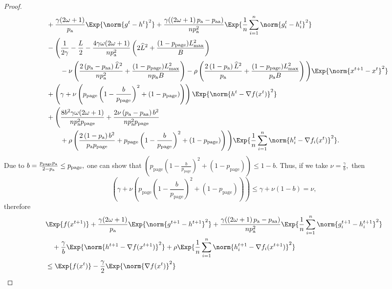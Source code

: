 \documentclass{article}
\newcommand*{\probavailable}{\ensuremath{p_{\textnormal{a}}}}
\newcommand*{\probpairaa}{\ensuremath{p_{\textnormal{aa}}}}
\newcommand*{\probpage}{\ensuremath{p_{\text{page}}}}
\begin{document}
\begin{proof}
\begin{align*}
      &\quad + \frac{\gamma (2 \omega + 1)}{\probavailable} \Exp{\norm{g^{t} - h^{t}}^2} + \frac{\gamma (\left(2 \omega + 1\right)\probavailable - \probpairaa)}{n \probavailable^2} \Exp{\frac{1}{n}\sum_{i=1}^n\norm{g^{t}_i - h^{t}_i}^2} \\
      &\quad - \Bigg(\frac{1}{2\gamma} - \frac{L}{2} - \frac{4 \gamma \omega (2 \omega + 1)}{n \probavailable^2} \left(2 \widehat{L}^2 + \frac{(1 - \probpage)L_{\max}^2}{B}\right) \\
      &\qquad\quad - \nu\left(\frac{2 \left(\probavailable - \probpairaa\right) \widehat{L}^2}{n \probavailable^2} + \frac{(1 - \probpage)L_{\max}^2}{n \probavailable B}\right) - \rho \left(\frac{2\left(1 - \probavailable\right)\widehat{L}^2}{\probavailable} + \frac{(1 - \probpage)L_{\max}^2}{\probavailable B}\right)\Bigg) \Exp{\norm{x^{t+1} - x^t}^2} \\
      &\quad + \left(\gamma + \nu \left(\probpage\left(1 - \frac{b}{\probpage}\right)^2 + (1 - \probpage)\right)\right) \Exp{\norm{h^{t} - \nabla f(x^{t})}^2} \\
      &\quad + \Bigg(\frac{8 b^2 \gamma \omega (2 \omega + 1)}{n \probavailable^2 \probpage} + \frac{2 \nu \left(\probavailable - \probpairaa\right) b^2}{n \probavailable^2 \probpage} \\
      &\qquad\quad+ \rho \left(\frac{2\left(1 - \probavailable\right)b^2}{\probavailable \probpage} + \probpage\left(1 - \frac{b}{\probpage}\right)^2 + (1 - \probpage)\right)\Bigg)\Exp{\frac{1}{n}\sum_{i=1}^n\norm{h^{t}_i - \nabla f_i(x^{t})}^2}.
    \end{align*}
    Due to $b = \frac{\probpage \probavailable}{2 - \probavailable} \leq \probpage,$ one can show that $\left(\probpage\left(1 - \frac{b}{\probpage}\right)^2 + (1 - \probpage)\right) \leq 1 - b.$ 
    Thus, if we take $\nu = \frac{\gamma}{b},$ then
    $$\left(\gamma + \nu \left(\probpage\left(1 - \frac{b}{\probpage}\right)^2 + (1 - \probpage)\right)\right) \leq \gamma + \nu (1 - b) = \nu,$$ therefore
    \begin{align*}
      &\Exp{f(x^{t + 1})} + \frac{\gamma (2 \omega + 1)}{\probavailable} \Exp{\norm{g^{t+1} - h^{t+1}}^2} + \frac{\gamma (\left(2 \omega + 1\right)\probavailable - \probpairaa)}{n \probavailable^2} \Exp{\frac{1}{n}\sum_{i=1}^n\norm{g^{t+1}_i - h^{t+1}_i}^2}\\
      &\quad  + \frac{\gamma}{b} \Exp{\norm{h^{t+1} - \nabla f(x^{t+1})}^2} + \rho \Exp{\frac{1}{n}\sum_{i=1}^n\norm{h^{t+1}_i - \nabla f_i(x^{t+1})}^2}\\
      &\leq \Exp{f(x^t)} - \frac{\gamma}{2}\Exp{\norm{\nabla f(x^t)}^2} \\

\end{align*}
\end{proof}
\end{document}
